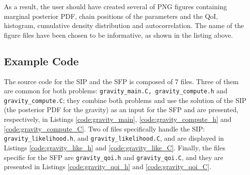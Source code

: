 As a result, the user should have created several of PNG figures containing marginal posterior PDF, 
chain positions of the parameters and the QoI, histogram, cumulative density distribution and 
autocorrelation. The name of the figure files have been chosen to be informative, as shown in the listing above.



\subsection{Example Code}\label{sec:gravity_code}

The source code for the SIP and the SFP is composed of 7 files.
Three of them are common for both problems: \texttt{gravity\_main.C, gravity\_compute.h} and 
\texttt{gravity\_compute.C}; they combine both problems and use the solution of the SIP 
(the posterior PDF for the gravity) as an input for the SFP and are presented, respectively, 
in Listings \ref{code:gravity_main}, \ref{code:gravity_compute_h} and \ref{code:gravity_compute_C}.
Two of files specifically  handle the SIP: \texttt{gravity\_likelihood.h}, and \texttt{gravity\_likelihood.C}, 
and are displayed in Listings \ref{code:gravity_like_h} and \ref{code:gravity_like_C}. Finally, the files 
specific for the SFP are \texttt{gravity\_qoi.h} and \texttt{gravity\_qoi.C}, and they are presented in 
Listings \ref{code:gravity_qoi_h} and \ref{code:gravity_qoi_C}.


 








